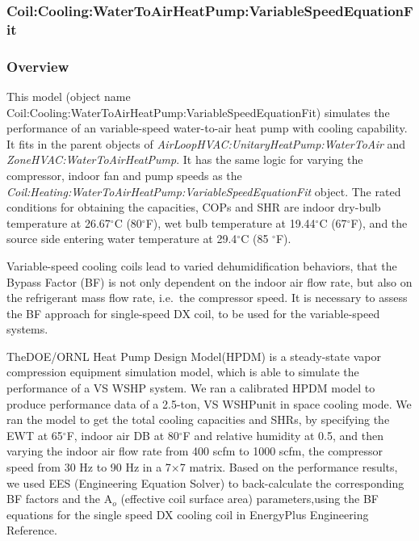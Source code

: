 \subsubsection{Coil:Cooling:WaterToAirHeatPump:VariableSpeedEquationFit}\label{coilcoolingwatertoairheatpumpvariablespeedequationfit}

\subsubsection{Overview}\label{overview-14}

This model (object name Coil:Cooling:WaterToAirHeatPump:VariableSpeedEquationFit) simulates the performance of an variable-speed water-to-air heat pump with cooling capability. It fits in the parent objects of \emph{AirLoopHVAC:UnitaryHeatPump:WaterToAir} and \emph{ZoneHVAC:WaterToAirHeatPump}. It has the same logic for varying the compressor, indoor fan and pump speeds as the \emph{Coil:Heating:WaterToAirHeatPump:VariableSpeedEquationFit} object. The rated conditions for obtaining the capacities, COPs and SHR are indoor dry-bulb temperature at 26.67\(^{\circ}\)C (80\(^{\circ}\)F), wet bulb temperature at 19.44\(^{\circ}\)C (67\(^{\circ}\)F), and the source side entering water temperature at 29.4\(^{\circ}\)C (85 \(^{\circ}\)F).

Variable-speed cooling coils lead to varied dehumidification behaviors, that the Bypass Factor (BF) is not only dependent on the indoor air flow rate, but also on the refrigerant mass flow rate, i.e.~the compressor speed. It is necessary to assess the BF approach for single-speed DX coil, to be used for the variable-speed systems.

TheDOE/ORNL Heat Pump Design Model(HPDM) is a steady-state vapor compression equipment simulation model, which is able to simulate the performance of a VS WSHP system. We ran a calibrated HPDM model to produce performance data of a 2.5-ton, VS WSHPunit in space cooling mode. We ran the model to get the total cooling capacities and SHRs, by specifying the EWT at 65\(^{\circ}\)F, indoor air DB at 80\(^{\circ}\)F and relative humidity at 0.5, and then varying the indoor air flow rate from 400 scfm to 1000 scfm, the compressor speed from 30 Hz to 90 Hz in a 7×7 matrix. Based on the performance results, we used EES (Engineering Equation Solver) to back-calculate the corresponding BF factors and the A\(_{o}\) (effective coil surface area) parameters,using the BF equations for the single speed DX cooling coil in EnergyPlus Engineering Reference.


